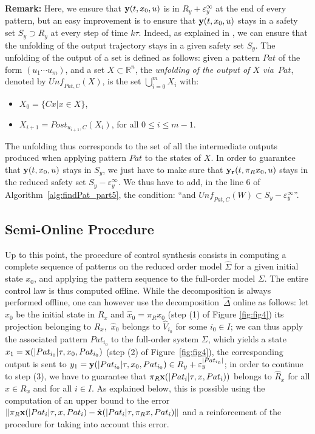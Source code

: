\vspace{1em}

{\bf Remark:}
 Here, we ensure that ${\bf y}(t,x_0,u)$ is in $R_y + \varepsilon_y^\infty$ at the end of every pattern, but an easy improvement is to ensure that ${\bf y}(t,x_0,u)$ stays in a safety set $S_y \supset R_y$ 
 at every step of time $k\tau$. Indeed, as explained in \cite{FKS-safety}, we can ensure that the unfolding of the output trajectory stays in a given safety set $S_y$.
 The unfolding of the output of a set is defined as follows:
 given a pattern $Pat$ of the form $(u_1\cdots u_m)$, and a set $X\subset\mathbb{R}^n$,
the {\em unfolding of the output of $X$ via~$Pat$}, 
denoted by $\mathit{Unf}_{Pat,C}(X)$, 
is the set $\bigcup_{i=0}^mX_i$ with:
\begin{itemize}
\item$X_0=\{ Cx \vert x \in X \} $,
\item $X_{i+1}=Post_{u_{i+1},C}(X_i)$, for all $0\leq i\leq m-1$.
\end{itemize}
The unfolding thus corresponds to the set of all the 
intermediate outputs produced when applying pattern $Pat$ to 
the states of $X$.
In order to guarantee that ${\bf y}(t,x_0,u)$ stays in $S_y$, we just have to make sure that ${\bf y_r}(t,\pi_Rx_0,u)$ stays in the reduced safety set $S_y - \varepsilon_y^\infty$.
We thus have to add, in the line $6$ of Algorithm~\ref{alg:findPat_part5}, the condition: ``and $\mathit{Unf}_{Pat,C}(W) \subset S_y -\varepsilon_y^\infty$''.






 \subsection{Semi-Online Procedure}
 

Up to this point, the procedure of control synthesis consists in computing a complete
sequence of patterns on the reduced order model $\hat \Sigma$ for a given initial 
state $x_0$, and applying the pattern sequence to the full-order model $\Sigma$. 
The entire control law is thus computed offline. While the decomposition
is always performed offline, one can however use the decomposition~$\hat \Delta$ online
as follows: let $x_0$ be the initial state in $R_x$ and $\hat x_0 = \pi_R x_0$  (step (1) of
Figure \ref{fig:fig4}) its projection
belonging to $\hat R_x$,~$\hat x_0$ belongs to $\hat V_{i_0}$ for some $i_0 \in I$; we can thus 
apply the associated pattern $Pat_{i_0}$ to the full-order system $\Sigma$, which yields
a state $x_1 = {\bf x}(\vert Pat_{i_0} \vert \tau,x_0,Pat_{i_0})$ (step (2) of Figure~\ref{fig:fig4}), the corresponding
output is sent to $y_1 = {\bf y}(\vert Pat_{i_0} \vert \tau,x_0,Pat_{i_0}) \in R_y + \varepsilon_y^{\vert Pat_{i_0} \vert}$; 
in order to continue to step (3), we have to guarantee that 
$\pi_R {\bf x}(\vert Pat_{i} \vert \tau,x,Pat_{i}))$ belongs to  $\hat R_x$ for all $x \in R_x$ and for all $i \in I$.
As explained below, this is possible using the computation of an upper bound to the
error 
 $\Vert \pi_R {\bf x}(\vert Pat_{i} \vert \tau,x,Pat_{i}) - {\hat {\bf x}}(\vert Pat_{i} \vert \tau,\pi_R x,Pat_{i}) \Vert $
and 
a reinforcement of the procedure for taking into account this error.


